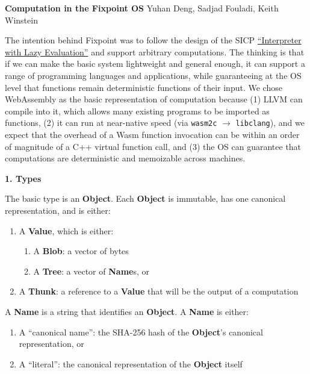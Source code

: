 \documentclass{article}
\newcommand{\blob}{\textbf{Blob}\xspace}
\newcommand{\valuex}{\textbf{Value}\xspace}
\newcommand{\object}{\textbf{Object}\xspace}
\newcommand{\thunk}{\textbf{Thunk}\xspace}
\newcommand{\name}{\textbf{Name}\xspace}
\newcommand{\names}{\textbf{Name}s\xspace}
\newcommand{\tree}{\textbf{Tree}\xspace}
\begin{document}
\textbf{Computation in the Fixpoint OS}\newline
Yuhan Deng, Sadjad Fouladi, Keith Winstein

The intention behind Fixpoint was to follow the design of the SICP
\href{https://mitpress.mit.edu/sites/default/files/sicp/full-text/book/book-Z-H-27.html#\%_sec_4.2.2}{``Interpreter
  with Lazy Evaluation''} and support arbitrary computations. The
thinking is that if we can make the basic system lightweight and
general enough, it can support a range of programming languages and
applications, while guaranteeing at the OS level that functions remain
deterministic functions of their input.  We chose WebAssembly as the
basic representation of computation because (1) LLVM can compile into
it, which allows many existing programs to be imported as functions,
(2) it can run at near-native speed (via \texttt{wasm2c} $\rightarrow$
\texttt{libclang}), and we expect that the overhead of a Wasm
function invocation can be within an order of magnitude of a C++
virtual function call, and (3) the OS can guarantee that computations
are deterministic and memoizable across machines.

\vspace{0.5\baselineskip}
{\Large \textbf{1. Types}}

The basic type is an \object. Each \object is immutable, has one canonical representation, and is either:
\begin{enumerate}[topsep=0pt]
\item A \valuex, which is either:
  \begin{enumerate}[topsep=0pt]
  \item A \blob: a vector of bytes

  \item A \tree: a vector of \names, or
  \end{enumerate}

\item A \thunk: a reference to a \valuex that will be the output of a computation
\end{enumerate}

A \name is a string that identifies an \object. A \name is either:
\begin{enumerate}[topsep=0pt]
\item A ``canonical name'': the SHA-256 hash of the \object's canonical representation, or

\item A ``literal'': the canonical representation of the \object itself
\end{enumerate}
\end{document}
